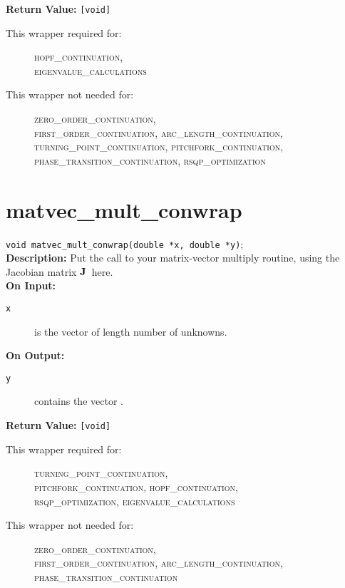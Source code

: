 {\bf Return Value:} \texttt{[void]}

\begin{description}
\item[This wrapper required for:]
\textsc{hopf\_continuation, \\ eigenvalue\_calculations}
\item[This wrapper not needed for:]
\textsc{zero\_order\_continuation,\\
first\_order\_continuation, arc\_length\_continuation, \\ 
turning\_point\_continuation, pitchfork\_continuation, \\ 
phase\_transition\_continuation, rsqp\_optimization}
\end{description}

\section{matvec\_mult\_conwrap}
\texttt{void matvec\_mult\_conwrap(double *x, double *y)}; \\

{\bf Description:}  Put the call to your matrix-vector multiply routine, using the Jacobian matrix ${\bf J}$\, here. \\

{\bf On Input:}
\begin{description}
\item[\texttt{x}] is the vector of length number of unknowns.
\end{description}

{\bf On Output:}
\begin{description}
\item[\texttt{y}] contains the vector \bfJ \bfx .
\end{description}

{\bf Return Value:} \texttt{[void]}

\begin{description}
\item[This wrapper required for:]
\textsc{
turning\_point\_continuation, \\
pitchfork\_continuation, hopf\_continuation,  \\
rsqp\_optimization, eigenvalue\_calculations}
\item[This wrapper not needed for:]
\textsc{zero\_order\_continuation,\\
first\_order\_continuation, arc\_length\_continuation, \\
phase\_transition\_continuation}
\end{description}

